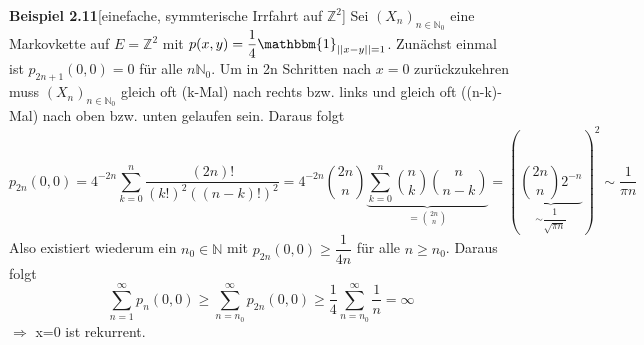 \textbf{Beispiel 2.11}[einefache, symmterische Irrfahrt auf $\mathbb{Z}^{2}$]
Sei $(X_{n})_{n \in \mathbb{N}_{0}}$ eine Markovkette auf $E=\mathbb{Z}^2$ mit $p(x,y)=\dfrac{1}{4} \mathbbm{1}_{\vert \vert x-y \vert \vert = 1}$. Zunächst einmal ist $p_{2n+1}(0,0)=0$ für alle $n \mathbb{N}_{0}$. Um in 2n Schritten nach $x=0$ zurückzukehren muss $(X_{n})_{n \in \mathbb{N}_{0}}$ gleich oft (k-Mal) nach rechts bzw. links und gleich oft ((n-k)-Mal) nach oben bzw. unten gelaufen sein. Daraus folgt
\begin{equation*}
p_{2n}(0,0) = 4^{-2n} \sum_{k=0}^{n} \dfrac{(2n)!}{(k!)^{2}((n-k)!)^{2}} = 4^{-2n} \binom{2n}{n} \underbrace{\sum_{k=0}^{n} \binom{n}{k} \binom{n}{n-k}}_{= \binom{2n}{n}} = ({\underbrace{\binom{2n}{n} 2^{-n}}_{\sim \dfrac{1}{\sqrt{\pi n}}}})^{2} \sim \dfrac{1}{\pi n}
\end{equation*}
Also existiert wiederum ein $n_{0} \in \mathbb{N}$ mit $p_{2n}(0,0) \geq \dfrac{1}{4n}$ für alle $n \geq n_{0}$. Daraus folgt 
\begin{equation*}
\sum_{n=1}^{\infty} p_{n}(0,0) \geq \sum_{n = n_{0}}^{\infty} p_{2n}(0,0) \geq \dfrac{1}{4} \sum_{n = n_{0}}^{\infty} \dfrac{1}{n} = \infty
\end{equation*}
$\Rightarrow$ x=0 ist rekurrent.